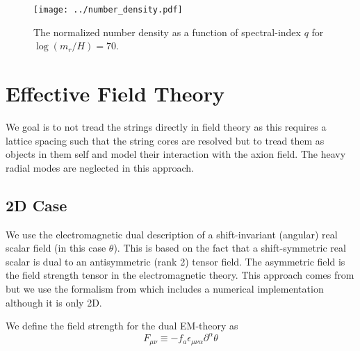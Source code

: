 \documentclass[a4paper]{article}
\begin{document}
\begin{figure}
	\texttt{[image: ../number\_density.pdf]}
	\caption{The normalized number density as a function of spectral-index $q$ for $\log(m_r/H) = 70$.}
\end{figure}

\section{Effective Field Theory}
We goal is to not tread the strings directly in field theory as this requires a lattice spacing such that the 
string cores are resolved but to tread them as objects in them self and model their interaction with the axion field.
The heavy radial modes are neglected in this approach. 

\subsection{2D Case}
We use the electromagnetic dual description of a shift-invariant (angular) real scalar field (in this case $\theta$).
This is based on the fact that a shift-symmetric real scalar is dual to an antisymmetric (rank 2) tensor field.
The asymmetric field is the field strength tensor in the electromagnetic theory.
This approach comes from \cite{pinning_down_the_axion_DABHOLKAR1990815} but we use the formalism from \cite{Axion2D_Fleury:2016xrz} which includes a numerical implementation although it is only 2D.

We define the field strength for the dual EM-theory as
\begin{equation}
	F_{\mu \nu} \equiv - f_a \epsilon_{\mu \nu \alpha} \partial^\alpha \theta
\end{equation}
\end{document}
